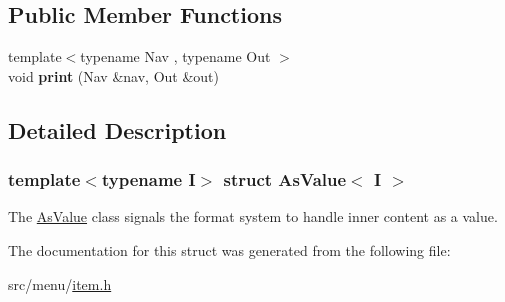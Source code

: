 \subsection*{Public Member Functions}
\begin{DoxyCompactItemize}
\item 
\mbox{\label{structAsValue_a4e2ddfac08c8f88bbc93ba4b4e291d6f}} 
{\footnotesize template$<$typename Nav , typename Out $>$ }\\void {\bfseries print} (Nav \&nav, Out \&out)
\end{DoxyCompactItemize}


\subsection{Detailed Description}
\subsubsection*{template$<$typename I$>$\newline
struct As\+Value$<$ I $>$}

The \hyperlink{structAsValue}{As\+Value} class signals the format system to handle inner content as a value. 

The documentation for this struct was generated from the following file\+:\begin{DoxyCompactItemize}
\item 
src/menu/\hyperlink{item_8h}{item.\+h}\end{DoxyCompactItemize}
